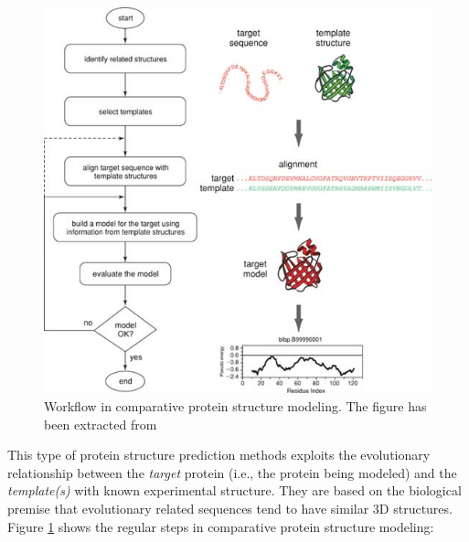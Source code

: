 \documentclass[12pt, b5paper,twoside]{tesi_upf}
\begin{document}
\begin{figure}[htbp]

  \centering
  	\includegraphics[scale=0.75]{../figures/workflow.jpg} %

	\caption [Workflow in comparative protein structure modeling]{Workflow in comparative protein structure modeling.  The figure has been extracted from \cite{Eswar2007}}
	\label{fig:workflow_modeling}
\end{figure}
\par This type of protein structure prediction methods exploits the evolutionary relationship between the \textit{target} protein (i.e., the protein being modeled) and the \textit{template(s)} with known experimental structure. They are based on the biological premise that evolutionary related sequences tend to have similar 3D structures. Figure \ref{fig:workflow_modeling} shows the regular steps in comparative protein structure modeling: 
\end{document}
